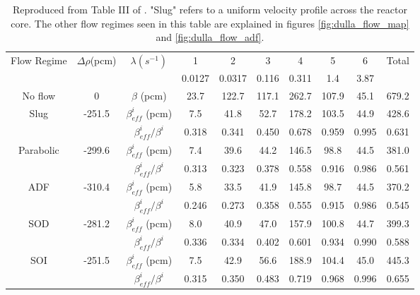 \documentclass[review]{elsarticle}
\begin{document}
\begin{table}[h]
    \caption{Reproduced from Table III of \cite{dulla_interactions_2007}. "Slug"
        refers to a uniform velocity profile across the reactor core.
        The other flow regimes seen in this table are explained in
        figures \ref{fig:dulla_flow_map} and \ref{fig:dulla_flow_adf}.} 
    \label{tbl:dulla_flow_regimes_beta}
    \begin{center}
        \begin{tabular}{|c|c|c|c|c|c|c|c|c|c|}
            \hline
            \multirow{2}{*}{Flow Regime} & \multirow{2}{*}{$\Delta \rho$(pcm)}
            &\multirow{2}{*}{$\lambda(s^{-1})$}&1 & 2 & 3 & 4 & 5 & 6 &
             \multirow{2}{*}{Total} \\
            \cline{4 - 9}
            & & & 0.0127 & 0.0317 & 0.116 & 0.311 & 1.4 & 3.87 & \\
            \hline
            No flow & 0 & $\beta$ (pcm) & 23.7 & 122.7 & 117.1 & 262.7 & 107.9 &
                45.1 & 679.2 \\
            \hline
            Slug & -251.5 & $\beta_{eff}^{i}$ (pcm) & 7.5 & 41.8 & 52.7 & 178.2&
                 103.5 & 44.9 & 428.6 \\
            & & $\beta_{eff}^{i}/\beta^{i}$ & 0.318 & 0.341 & 0.450 & 0.678 &
                0.959 & 0.995 & 0.631 \\
            \hline
            Parabolic & -299.6 & $\beta_{eff}^{i}$ (pcm) & 7.4 & 39.6 & 44.2 &
                146.5 & 98.8 & 44.5 & 381.0 \\
            & & $\beta_{eff}^{i}/\beta^{i}$ & 0.313 & 0.323 & 0.378 & 0.558 &
                0.916 & 0.986 & 0.561 \\
            \hline
            ADF & -310.4 & $\beta_{eff}^{i}$ (pcm) & 5.8 & 33.5 & 41.9 & 145.8 &
                 98.7 & 44.5 & 370.2 \\
            & & $\beta_{eff}^{i}/\beta^{i}$ & 0.246 & 0.273 & 0.358 & 0.555 &
                0.915 & 0.986 & 0.545 \\
            \hline
            SOD & -281.2 & $\beta_{eff}^{i}$ (pcm) & 8.0 & 40.9 & 47.0 & 157.9 &
                100.8 & 44.7 & 399.3 \\
            & & $\beta_{eff}^{i}/\beta^{i}$ & 0.336 & 0.334 & 0.402 & 0.601 &
                0.934 & 0.990 & 0.588 \\
            \hline
            SOI & -251.5 & $\beta_{eff}^{i}$ (pcm) & 7.5 & 42.9 & 56.6 & 188.9 &
                104.4 & 45.0 & 445.3 \\
            & & $\beta_{eff}^{i}/\beta^{i}$ & 0.315 & 0.350 & 0.483 & 0.719 &
                0.968 & 0.996 & 0.655 \\
            \hline
        \end{tabular}
    \end{center}
\end{table}
\end{document}
